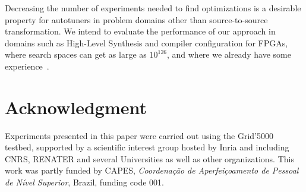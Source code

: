 \documentclass[conference]{IEEEtran}
\begin{document}
Decreasing the number of experiments needed to find optimizations is a desirable
property for autotuners in problem domains other than source-to-source
transformation. We intend to evaluate the performance of our approach in domains
such as High-Level Synthesis and compiler configuration for FPGAs, where search
spaces can get as large as \(10^{126}\), and where we already have some
experience~\cite{bruel2017autotuninghls}.
\section*{Acknowledgment}
\label{sec:orgc329f28}
Experiments presented in this paper were carried out using the Grid'5000
testbed, supported by a scientific interest group hosted by Inria and including
CNRS, RENATER and several Universities as well as other organizations.
This work was partly funded by CAPES, \emph{Coordenação de Aperfeiçoamento de Pessoal
de Nível Superior}, Brazil, funding code 001.



\end{document}
